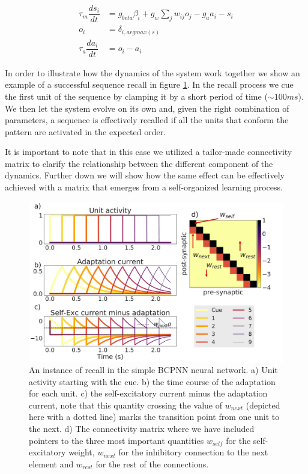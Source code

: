 \documentclass[10pt,a4paper]{article}
\begin{document}
\begin{align}
\tau_m \dfrac{ds_i}{dt} &= g_{beta}\beta_i + g_{w}\sum_{j} w_{ij} o_j  - g_a a_i - s_i \label{eq:simple_bcpnn} \\ 
o_i &=  \delta_{i, argmax(s)} \label{eq:simple_bcpnn_max} \\ 
\tau_a \dfrac{da_i}{dt} &= o_i - a_i \label{eq:simple_bcpnn_adaptation}
\end{align}

In order to illustrate how the dynamics of the system work together we show an example of a successful sequence recall in figure \ref{fig:bcpnn_simple_recall}. In the recall process we cue the first unit of the sequence by clamping it by a short period of time ($\sim 100ms$). We then let the system evolve on its own and, given the right combination of parameters, a sequence is effectively recalled if all the units that conform the pattern are activated in the expected order. 

It is important to note that in this case we utilized a tailor-made connectivity matrix to clarify the relationship between the different component of the dynamics. Further down we will show how the same effect can be effectively achieved with a matrix that emerges from a self-organized learning process.  

\begin{figure}[H]
\centering
\includegraphics[scale=0.26]{simple_bcpnn_recall.pdf}
\caption{An instance of recall in the simple BCPNN neural network. a) Unit activity starting with the cue. b) the time course of the adaptation for each unit. c) the self-excitatory current minus the adaptation current, note that this quantity crossing the value of $w_{next}$ (depicted here with a dotted line) marks the transition point from one unit to the next. d) The connectivity matrix where we have included pointers to the three most important quantities $w_{self}$ for the self-excitatory weight, $w_{next}$ for the inhibitory connection to the next element and $w_{rest}$ for the rest of the connections.}
\label{fig:bcpnn_simple_recall}
\end{figure}
\end{document}
